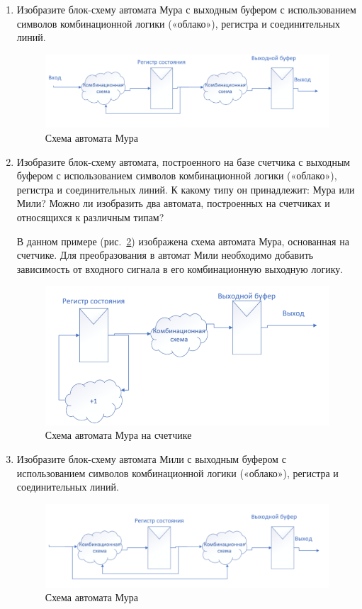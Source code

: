 \documentclass[a4paper,14pt]{article}
\begin{document}
	\begin{enumerate}
		\item Изобразите блок-схему автомата Мура с выходным буфером с использованием символов комбинационной логики («облако»), регистра и соединительных линий.
		
		\begin{figure}[H]
			\centering
			\includegraphics[width=0.9\linewidth]{images/q_4}
			\caption{Схема автомата Мура}
			\label{fig:q_4}
		\end{figure}
	
		\item Изобразите блок-схему автомата, построенного на базе счетчика с выходным
		буфером с использованием символов комбинационной логики («облако»), регистра и соединительных линий. 
		К какому типу он принадлежит: Мура или Мили? Можно ли изобразить два автомата, построенных на счетчиках и относящихся к различным	типам?
		
		В данном примере (рис.~\ref{fig:q_5}) изображена схема автомата Мура, основанная на счетчике.
		Для преобразования в автомат Мили необходимо добавить зависимость от входного сигнала в его комбинационную выходную логику.
		
		\begin{figure}[H]
			\centering
			\includegraphics[width=0.9\linewidth]{images/q_5}
			\caption{Схема автомата Мура на счетчике}
			\label{fig:q_5}
		\end{figure}
	
		\item Изобразите блок-схему автомата Мили с выходным буфером с использованием символов комбинационной логики («облако»), регистра и соединительных линий.
		\begin{figure}[H]
			\centering
			\includegraphics[width=0.9\linewidth]{images/q_6}
			\caption{Схема автомата Мура}
			\label{fig:q_6}
		\end{figure}
	\end{enumerate}
	
\end{document}
